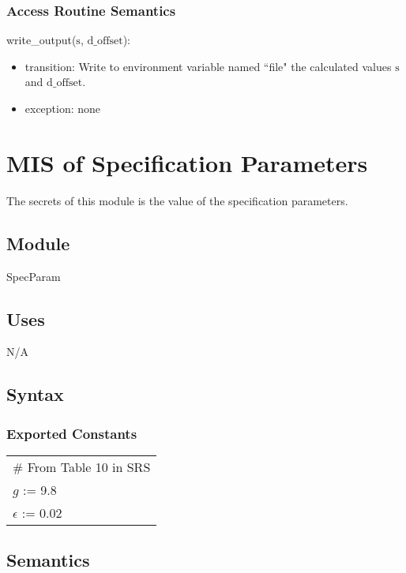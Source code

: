 \documentclass[12pt, titlepage]{article}
\begin{document}
\subsubsection{Access Routine Semantics}

\noindent write\_output($\text{s}$, $\text{d\_offset}$):
\begin{itemize}
\item transition:  Write to environment variable named ``file" the calculated values $\text{s}$ and $\text{d\_offset}$.
\item exception: none
\end{itemize}

\newpage

\section{MIS of Specification Parameters} \label{SpecParam}

The secrets of this module is the value of the specification parameters.

\subsection{Module}

SpecParam

\subsection{Uses}

N/A

\subsection{Syntax}

\subsubsection{Exported Constants}

\renewcommand{\arraystretch}{1.2}
\begin{longtable*}[l]{l} 
\# From Table 10 in SRS\\
  $g$ := 9.8\\
  $\epsilon$ := 0.02\\
\end{longtable*}

\subsection{Semantics}
\end{document}
